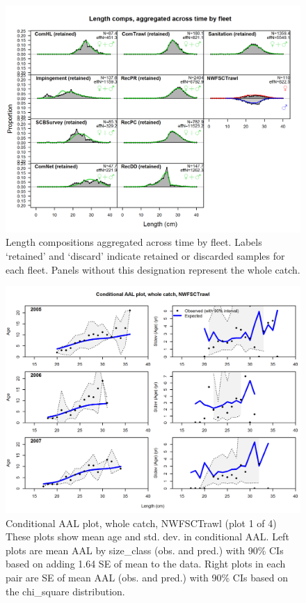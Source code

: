 \documentclass[12pt,]{article}
\begin{document}
\begin{figure}[htbp]
\centering
\includegraphics{r4ss/plots_mod1/comp_lenfit__aggregated_across_time.png}
\caption{Length compositions aggregated across time by fleet. Labels
`retained' and `discard' indicate retained or discarded samples for each
fleet. Panels without this designation represent the whole catch.
\label{fig:comp_lenfit__aggregated_across_time}}
\end{figure}

\FloatBarrier

\begin{figure}[htbp]
\centering
\includegraphics{./r4ss/plots_mod1/comp_condAALfit_Andre_plotsflt8mkt0_page1.png}
\caption{Conditional AAL plot, whole catch, NWFSCTrawl (plot 1 of 4)
These plots show mean age and std. dev. in conditional AAL. Left plots
are mean AAL by size\_class (obs. and pred.) with 90\% CIs based on
adding 1.64 SE of mean to the data. Right plots in each pair are SE of
mean AAL (obs. and pred.) with 90\% CIs based on the chi\_square
distribution.
\label{fig:mod1_4_comp_condAALfit_Andre_plotsflt8mkt0_page1}}
\end{figure}
\end{document}
